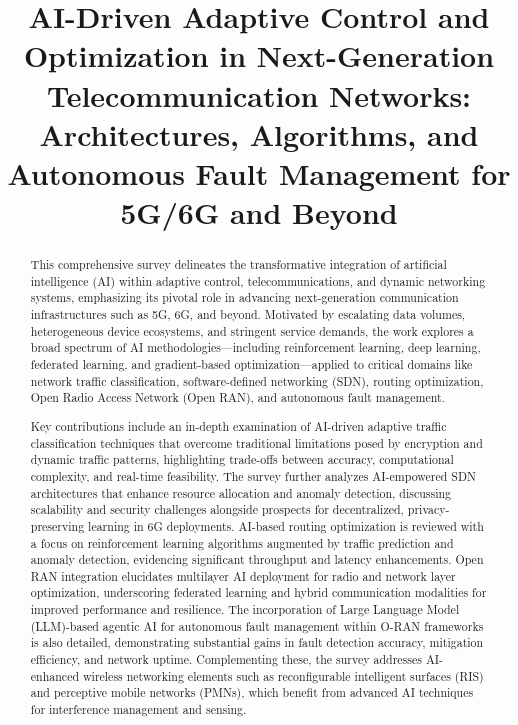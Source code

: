 \title{AI-Driven Adaptive Control and Optimization in Next-Generation Telecommunication Networks: Architectures, Algorithms, and Autonomous Fault Management for 5G/6G and Beyond}
\maketitle

\begin{abstract}
This comprehensive survey delineates the transformative integration of artificial intelligence (AI) within adaptive control, telecommunications, and dynamic networking systems, emphasizing its pivotal role in advancing next-generation communication infrastructures such as 5G, 6G, and beyond. Motivated by escalating data volumes, heterogeneous device ecosystems, and stringent service demands, the work explores a broad spectrum of AI methodologies—including reinforcement learning, deep learning, federated learning, and gradient-based optimization—applied to critical domains like network traffic classification, software-defined networking (SDN), routing optimization, Open Radio Access Network (Open RAN), and autonomous fault management.

Key contributions include an in-depth examination of AI-driven adaptive traffic classification techniques that overcome traditional limitations posed by encryption and dynamic traffic patterns, highlighting trade-offs between accuracy, computational complexity, and real-time feasibility. The survey further analyzes AI-empowered SDN architectures that enhance resource allocation and anomaly detection, discussing scalability and security challenges alongside prospects for decentralized, privacy-preserving learning in 6G deployments. AI-based routing optimization is reviewed with a focus on reinforcement learning algorithms augmented by traffic prediction and anomaly detection, evidencing significant throughput and latency enhancements. Open RAN integration elucidates multilayer AI deployment for radio and network layer optimization, underscoring federated learning and hybrid communication modalities for improved performance and resilience. The incorporation of Large Language Model (LLM)-based agentic AI for autonomous fault management within O-RAN frameworks is also detailed, demonstrating substantial gains in fault detection accuracy, mitigation efficiency, and network uptime. Complementing these, the survey addresses AI-enhanced wireless networking elements such as reconfigurable intelligent surfaces (RIS) and perceptive mobile networks (PMNs), which benefit from advanced AI techniques for interference management and sensing.


\end{abstract}
